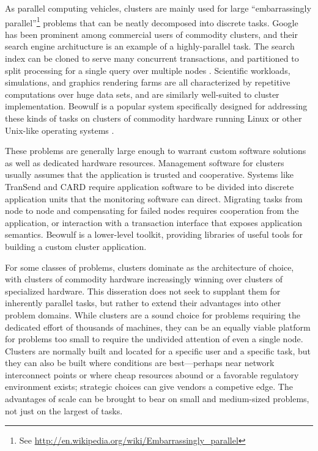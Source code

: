 As parallel computing vehicles, clusters are mainly used for large ``embarrassingly parallel''\footnote{See \url{http://en.wikipedia.org/wiki/Embarrassingly_parallel}} problems that can be neatly decomposed into discrete tasks. Google has been prominent among commercial users of commodity clusters, and their search engine architucture is an example of a highly-parallel task. The search index can be cloned to serve many concurrent transactions, and partitioned to split processing for a single query over multiple nodes \cite{barroso03}. Scientific workloads, simulations, and graphics rendering farms are all characterized by repetitive computations over huge data sets, and are similarly well-suited to cluster implementation. Beowulf is a popular system specifically designed for addressing these kinds of tasks on clusters of commodity hardware running Linux or other Unix-like operating systems \cite{ridge}.

These problems are generally large enough to warrant custom software solutions as well as dedicated hardware resources. Management software for clusters usually assumes that the application is trusted and cooperative. Systems like TranSend \cite{fox} and CARD \cite{anderson97} require application software to be divided into discrete application units that the monitoring software can direct. Migrating tasks from node to node and compensating for failed nodes requires cooperation from the application, or interaction with a transaction interface that exposes application semantics. Beowulf \cite{ridge} is a lower-level toolkit, providing libraries of useful tools for building a custom cluster application.

For some classes of problems, clusters dominate as the architecture of choice, with clusters of commodity hardware increasingly winning over clusters of specialized hardware. This disseration does not seek to supplant them for inherently parallel tasks, but rather to extend their advantages into other problem domains. While clusters are a sound choice for problems requiring the dedicated effort of thousands of machines, they can be an equally viable platform for problems too small to require the undivided attention of even a single node. Clusters are normally built and located for a specific user and a specific task, but they can also be built where conditions are best---perhaps near network interconnect points or where cheap resources abound or a favorable regulatory environment exists; strategic choices can give vendors a competive edge. The advantages of scale can be brought to bear on small and medium-sized problems, not just on the largest of tasks.

